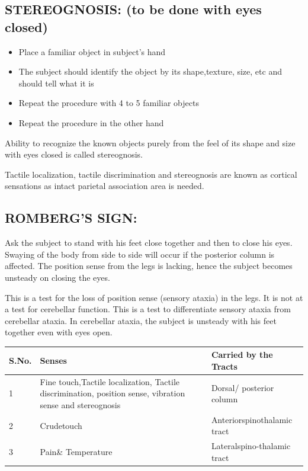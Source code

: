\documentclass[a4paper,12pt]{book}
\begin{document}
	\subsection*{STEREOGNOSIS: (to be done with eyes closed)}
\begin{itemize}
\item{Place a familiar object in subject’s hand}
\item{The subject should identify the object by its shape,texture, size, etc and should tell what it is}
\item{Repeat the procedure with 4 to 5 familiar objects}
\item{Repeat the procedure in the other hand}
	\end{itemize}
	\par
	Ability to recognize the known objects purely from the feel of its shape and size with eyes closed is called stereognosis.
	\par
	Tactile localization, tactile discrimination and stereognosis are known as cortical sensations as intact parietal association area is needed.
\subsection*{ROMBERG’S SIGN:}
\par
	Ask the subject to stand with his feet close together and then to close his eyes. Swaying of the body from side to side will occur if the posterior column is affected. The position sense from the legs is lacking, hence the subject becomes unsteady on closing the eyes.
	\par
	This is a test for the loss of position sense (sensory ataxia) in the legs. It is not at a test for cerebellar function. This is a test to differentiate sensory ataxia from cerebellar ataxia. In cerebellar ataxia, the subject is unsteady with his feet together even with eyes open.

	\begin{table}
\centering
		\begin{tabular}{|p{1in}|p{1.75in}|p{1.75in}|}
\hline
S.No. & \textbf{Senses}                                                                                       & \textbf{Carried by the Tracts}  \\
\hline
1     & Fine touch,Tactile localization, Tactile discrimination, position sense, vibration sense and stereognosis & Dorsal/ posterior column       \\
\hline
2     & Crudetouch                                                                                            & Anteriorspinothalamic tract    \\
\hline
3     & Pain\& Temperature                                                                                    & Lateralspino-thalamic tract    \\
\hline
\end{tabular}
\end{table}
\end{document}
